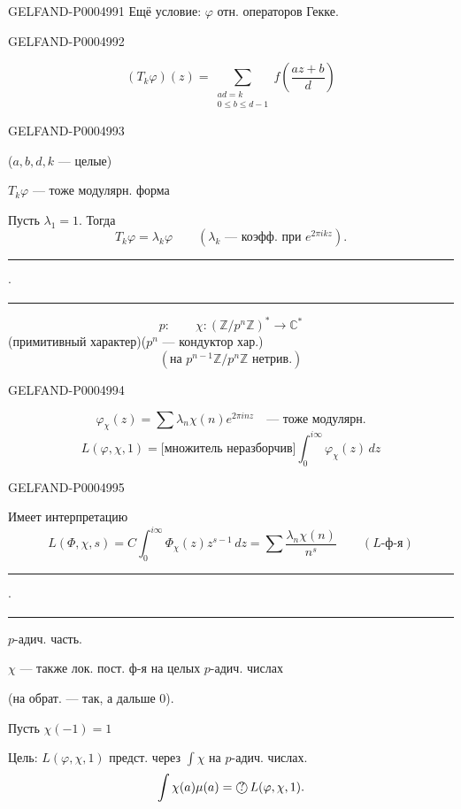 \begin{GelfandAdjacentEvidence}{GELFAND-P000499}{1}
Ещё условие: $\varphi$  отн.
 операторов Гекке.
\end{GelfandAdjacentEvidence}
\begin{GelfandAdjacentEvidence}{GELFAND-P000499}{2}


\[
(T_k\varphi)(z)=\sum_{\substack{ad=k\\0\le b\le d-1}}
f\left(\frac{az+b}{d}\right)
\]
\end{GelfandAdjacentEvidence}
\begin{GelfandAdjacentEvidence}{GELFAND-P000499}{3}

($a,b,d,k$ — целые)

$T_k\varphi$ — тоже модулярн. форма

Пусть $\lambda_1=1$. Тогда
\[
T_k\varphi=\lambda_k\varphi\qquad
(\lambda_k\text{ — коэфф. при }e^{2\pi ikz}).
\]
\begin{center}\rule{1.4cm}{0.3pt}\quad$\cdot$\quad\rule{1.6cm}{0.3pt}\end{center}

\[
p:\qquad\chi:(\mathbb{Z}/p^n\mathbb{Z})^*\to\mathbb{C}^*
\]
(примитивный характер)\qquad($p^n$ — кондуктор хар.)
\[
(\text{на }p^{n-1}\mathbb{Z}/p^n\mathbb{Z}\text{ нетрив.})
\]
\end{GelfandAdjacentEvidence}
\begin{GelfandAdjacentEvidence}{GELFAND-P000499}{4}


\[
\varphi_\chi(z)=\sum\lambda_n\chi(n)e^{2\pi inz}
\quad\text{— тоже модулярн.}
\]
\[
L(\varphi,\chi,1)=\text{[множитель неразборчив]}\int_0^{i\infty}\varphi_\chi(z)\,dz
\]
\end{GelfandAdjacentEvidence}
\begin{GelfandAdjacentEvidence}{GELFAND-P000499}{5}


Имеет интерпретацию
\[
L(\Phi,\chi,s)=C\int_0^{i\infty}\Phi_\chi(z)z^{s-1}\,dz
=\sum\frac{\lambda_n\chi(n)}{n^s}\qquad(L\text{-ф-я})
\]
\begin{center}\rule{2cm}{0.3pt}\quad$\cdot$\quad\rule{2.3cm}{0.3pt}\end{center}

$p$-адич. часть.

$\chi$ — также лок. пост. ф-я на целых $p$-адич. числах

(на обрат. — так, а дальше $0$).

Пусть $\chi(-1)=1$

Цель: $L(\varphi,\chi,1)$ предст. через $\int\chi$ на $p$-адич. числах.
\[
\int\chi(a)\mu(a)=\text{\textcircled{?}}\,L(\varphi,\chi,1).
\]
\end{GelfandAdjacentEvidence}
